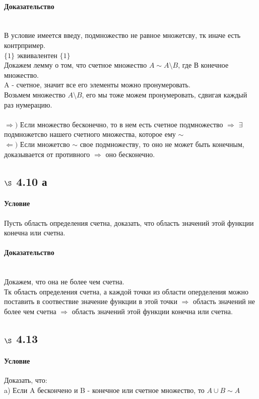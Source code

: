 \documentclass[a4paper,12pt]{article}
\begin{document}
\paragraph*{Доказательство}\mbox{}\\
В условие имеется введу, подмножество не равное множетсву, тк иначе есть контрпример.\\
$\{1\}$ эквивалентен $\{1\}$\\
Докажем лемму о том, что счетное множество $ A \sim A \setminus B $, где В конечное множество.\\
A - счетное, значит все его элементы можно пронумеровать. \\
Возьмем множество  $A \setminus B $, его мы тоже можем пронумеровать, сдвигая каждый раз нумерацию.\\
\\
$\Rightarrow ) $ Если множество бесконечно, то в нем есть счетное подмножество $\Rightarrow$ $\exists$ подмножетсво нашего счетного множества, которое ему  $ \sim $\\
$\Leftarrow )$ Если множетсво $ \sim $ свое подмножеству, то оно не может быть конечным, доказывается от противного $\Rightarrow$ оно бесконечно.

\subsection*{$\S$ 4.10 а}
\paragraph*{Условие}
Пусть область определения счетна, доказать, что область значений этой функции конечна или счетна. \paragraph*{Доказательство}\mbox{}\\
Докажем, что она не более чем счетна.\\
Тк область определения счетна, а каждой точки из области оперделения можно поставить в соотвествие значение функции в этой точки $\Rightarrow$ область значений не более чем счетна $\Rightarrow$ область значений этой функции конечна или счетна.\\

\subsection*{$\S$ 4.13}
\paragraph*{Условие}
Доказать, что:\\
a) Если A бескончено и B - конечное или счетное множество, то $ A \cup B \sim A$
\end{document}
